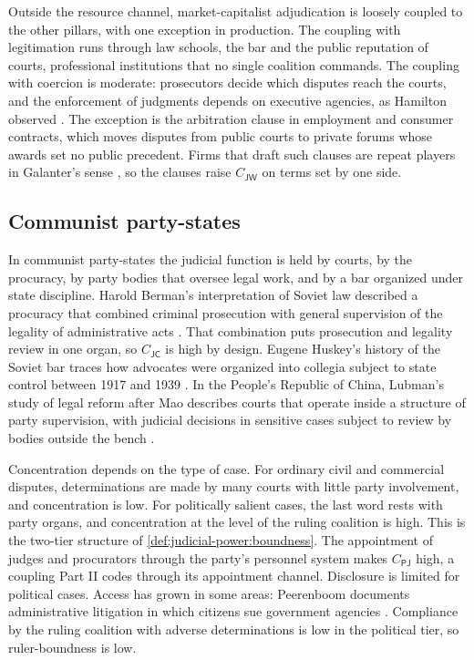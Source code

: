 \documentclass[11pt,letterpaper]{article}
\theoremstyle{definition}
\theoremstyle{remark}
\newcommand{\pP}{\mathsf{P}}
\newcommand{\pJ}{\mathsf{J}}
\newcommand{\pC}{\mathsf{C}}
\newcommand{\pW}{\mathsf{W}}
\begin{document}
Outside the resource channel, market-capitalist adjudication is loosely coupled to the other pillars, with one exception in production. The coupling with legitimation runs through law schools, the bar and the public reputation of courts, professional institutions that no single coalition commands. The coupling with coercion is moderate: prosecutors decide which disputes reach the courts, and the enforcement of judgments depends on executive agencies, as Hamilton observed \citep{hamilton1788}. The exception is the arbitration clause in employment and consumer contracts, which moves disputes from public courts to private forums whose awards set no public precedent. Firms that draft such clauses are repeat players in Galanter's sense \citep{galanter1974}, so the clauses raise $C_{\pJ\pW}$ on terms set by one side.

\subsection{Communist party-states}

In communist party-states the judicial function is held by courts, by the procuracy, by party bodies that oversee legal work, and by a bar organized under state discipline. Harold Berman's interpretation of Soviet law described a procuracy that combined criminal prosecution with general supervision of the legality of administrative acts \citep{berman1963}. That combination puts prosecution and legality review in one organ, so $C_{\pJ\pC}$ is high by design. Eugene Huskey's history of the Soviet bar traces how advocates were organized into collegia subject to state control between 1917 and 1939 \citep{huskey1986}. In the People's Republic of China, Lubman's study of legal reform after Mao describes courts that operate inside a structure of party supervision, with judicial decisions in sensitive cases subject to review by bodies outside the bench \citep{lubman1999}.

Concentration depends on the type of case. For ordinary civil and commercial disputes, determinations are made by many courts with little party involvement, and concentration is low. For politically salient cases, the last word rests with party organs, and concentration at the level of the ruling coalition is high. This is the two-tier structure of \cref{def:judicial-power:boundness}. The appointment of judges and procurators through the party's personnel system makes $C_{\pP\pJ}$ high, a coupling Part II codes through its appointment channel. Disclosure is limited for political cases. Access has grown in some areas: Peerenboom documents administrative litigation in which citizens sue government agencies \citep{peerenboom2002}. Compliance by the ruling coalition with adverse determinations is low in the political tier, so ruler-boundness is low.
\end{document}
